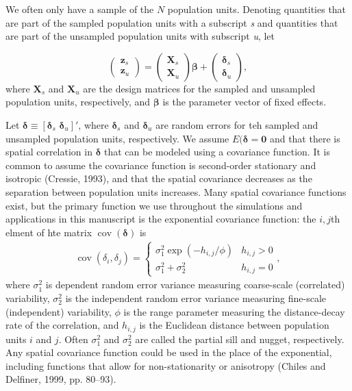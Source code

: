 \documentclass[]{elsarticle} %
\begin{document}
We often only have a sample of the \(N\) population units. Denoting
quantities that are part of the sampled population units with a
subscript \emph{s} and quantities that are part of the unsampled
population units with subscript \emph{u}, let

\begin{equation}
\begin{pmatrix} \label{equation:Zmarginal}
    \mathbf{z}_s      \\
    \mathbf{z}_u
\end{pmatrix}
=
\begin{pmatrix}
  \mathbf{X}_s    \\
  \mathbf{X}_u
\end{pmatrix}
\bm{\beta} +
\begin{pmatrix}
\bm{\delta}_s    \\
\bm{\delta}_u
\end{pmatrix},
\end{equation} where \(\mathbf{X}_s\) and \(\mathbf{X}_u\) are the
design matrices for the sampled and unsampled population units,
respectively, and \(\bm{\beta}\) is the parameter vector of fixed
effects.

Let \(\bm{\delta} \equiv [\bm{\delta}_s \,\, \bm{\delta}_u]'\), where
\(\bm{\delta}_s\) and \(\bm{\delta}_u\) are random errors for teh
sampled and unsampled population units, respectively. We assume
\(E(\bm{\delta} = \mathbf{0}\) and that there is spatial correlation in
\(\bm{\delta}\) that can be modeled using a covariance function. It is
common to assume the covariance function is second-order stationary and
isotropic (Cressie, 1993), and that the spatial covariance decreases as
the separation between population units increases. Many spatial
covariance functions exist, but the primary function we use throughout
the simulations and applications in this manuscript is the exponential
covariance function: the \(i,j\)th elment of hte matrix
\(\mathop{\mathrm{{cov}}}(\bm{\delta})\) is \mbox{}
\begin{align}\label{equation:expcov}
\mathop{\mathrm{{cov}}}(\delta_i, \delta_j) = 
\begin{cases} 
\sigma^2_{1}\exp(-h_{i,j}/\phi) & h_{i,j} > 0 \\
\sigma^2_{1} + \sigma^2_2 & h_{i,j} = 0
\end{cases}
,
\end{align} where \(\sigma^2_{1}\) is dependent random error variance
measuring coarse-scale (correlated) variability, \(\sigma^2_{2}\) is the
independent random error variance measuring fine-scale (independent)
variability, \(\phi\) is the range parameter measuring the
distance-decay rate of the correlation, and \(h_{i,j}\) is the Euclidean
distance between population units \(i\) and \(j\). Often
\(\sigma^2_{1}\) and \(\sigma^2_{2}\) are called the partial sill and
nugget, respectively. Any spatial covariance function could be used in
the place of the exponential, including functions that allow for
non-stationarity or anisotropy (Chiles and Delfiner, 1999, pp. 80--93).
\end{document}

